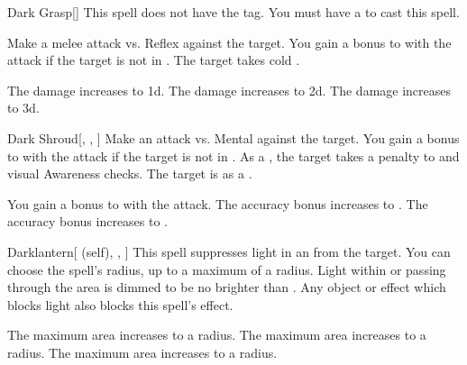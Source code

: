 \lowercase{\hypertarget{spell:Dark Grasp}{}}\label{spell:Dark Grasp}
\begin{freeability}[Rank 1]{\hypertarget{spell:Dark Grasp}{Dark Grasp}}[]
This spell does not have the  tag.
You must have a  to cast this spell.

Make a melee attack vs. Reflex against the target.
You gain a  bonus to  with the attack if the target is not in .
\hit The target takes cold .

\rankline
{} The damage increases to  \plus1d.
 The damage increases to  \plus2d.
 The damage increases to  \plus3d.
\end{freeability}
\vspace{0.25em}



\lowercase{\hypertarget{spell:Dark Shroud}{}}\label{spell:Dark Shroud}
\begin{freeability}[Rank 1]{\hypertarget{spell:Dark Shroud}{Dark Shroud}}[, , ]
Make an attack vs. Mental against the target.
You gain a  bonus to  with the attack if the target is not in .
\hit As a , the target takes a  penalty to  and visual Awareness checks.
\crit The target is  as a .

\rankline
{} You gain a  bonus to  with the attack.
 The accuracy bonus increases to .
 The accuracy bonus increases to .
\end{freeability}
\vspace{0.25em}



\lowercase{\hypertarget{spell:Darklantern}{}}\label{spell:Darklantern}
\begin{attuneability}[Rank 1]{\hypertarget{spell:Darklantern}{Darklantern}}[ (self), , ]
This spell suppresses light in an  from the target.
You can choose the spell's radius, up to a maximum of a \areamed radius.
Light within or passing through the area is dimmed to be no brighter than .
Any object or effect which blocks light also blocks this spell's effect.

\rankline
{} The maximum area increases to a \arealarge radius.
 The maximum area increases to a \areahuge radius.
 The maximum area increases to a \areaext radius.
\end{attuneability}
\vspace{0.25em}




